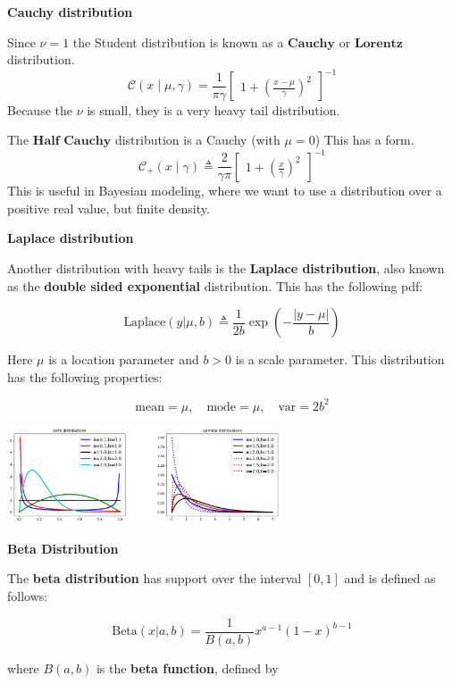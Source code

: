 \documentclass[10pt,landscape]{article}
\begin{document}
\begin{multicols*}{3}
\textbf{Cauchy distribution}

Since $\nu=1$ the Student distribution is known as a $\textbf{Cauchy}$ or $\textbf{Lorentz}$ distribution.
\[
    \mathcal{C}(x\mid\mu,\gamma)=\frac{1}{\pi\gamma}
    \begin{bmatrix}
        1+\left(\frac{x-\mu}{\gamma}\right)^2
    \end{bmatrix}^{-1}
\]
Because the $\nu$ is small, they is a very heavy tail distribution.

The $\textbf{Half Cauchy}$ distribution is a Cauchy (with $\mu=0$) This has a form. 
\[
    \mathcal{C}_+(x\mid \gamma) \triangleq \frac{2}{\gamma\pi}
    \begin{bmatrix}
        1+\left(\frac{x}{\gamma}\right)^2
    \end{bmatrix}^{-1}
\]
This is useful in Bayesian modeling, where we want to use a distribution over a positive real value, but finite density.
\vspace{8\baselineskip}

\textbf{Laplace distribution}

Another distribution with heavy tails is the \textbf{Laplace distribution}, also known as the \textbf{double sided exponential} distribution. This has the following pdf:

\[
\text{Laplace}(y | \mu, b) \triangleq \frac{1}{2b} \exp \left( -\frac{|y - \mu|}{b} \right)
\]

Here $\mu$ is a location parameter and $b > 0$ is a scale parameter. This distribution has the following properties:

\[
\text{mean} = \mu, \quad \text{mode} = \mu, \quad \text{var} = 2b^2
\]
\begin{minipage}{\linewidth}
    \centering
    \includegraphics[width=3.2in]{figures/beta-gamma-distribution.PNG}
\end{minipage}
\textbf{Beta Distribution}

The \textbf{beta distribution} has support over the interval $[0,1]$ and is defined as follows:

\[
\text{Beta}(x | a, b) = \frac{1}{B(a, b)} x^{a-1} (1 - x)^{b-1} 
\]

where $B(a, b)$ is the \textbf{beta function}, defined by


\end{multicols*}
\end{document}
